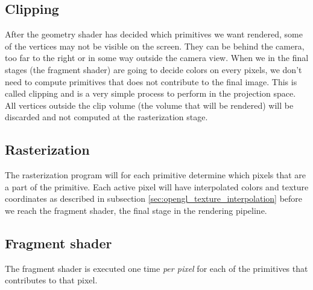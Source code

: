 \subsection{Clipping}
After the geometry shader has decided which primitives we want rendered, some of the vertices may not be visible on the screen. They can be behind the camera, too far to the right or in some way outside the camera view. When we in the final stages (the fragment shader) are going to decide colors on every pixels, we don't need to compute primitives that does not contribute to the final image. This is called clipping and is a very simple process to perform in the projection space. All vertices outside the clip volume (the volume that will be rendered) will be discarded and not computed at the rasterization stage.
\subsection{Rasterization}
The rasterization program will for each primitive determine which pixels that are a part of the primitive. Each active pixel will have interpolated colors and texture coordinates as described in subsection \ref{sec:opengl_texture_interpolation} before we reach the fragment shader, the final stage in the rendering pipeline.
\subsection{Fragment shader}
The fragment shader is executed one time \textit{per pixel} for each of the primitives that contributes to that pixel. 